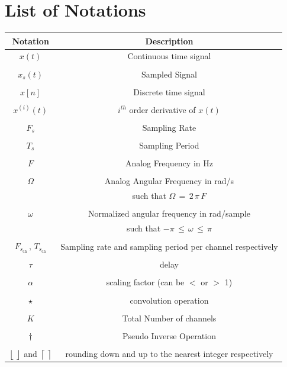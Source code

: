 






\chapter*{List of Notations}

\begin{longtable}{c|c}
Notation & Description \\ \hline
$x(t)$ & Continuous time signal \\ \\
$x_s(t)$ & Sampled Signal \\ \\
$x[n]$ & Discrete time signal \\ \\
$x^{(i)}(t)$ & $i^{th}$ order derivative of $x(t)$ \\ \\
$F_s$ & Sampling Rate \\ \\
$T_s$ & Sampling Period \\ \\
$F$ & Analog Frequency in Hz \\ \\
$\Omega$ & Analog Angular Frequency in rad/s \\
& such that $\Omega \, = \, 2 \, \pi \, F $ \\ \\
$\omega$ & Normalized angular frequency in rad/sample \\
& such that $ -\pi \, \leq \, \omega \, \leq \, \pi$ \\ \\
$F_{s_{\text{ch}}} \, , \, T_{s_{\text{ch}}}$ & Sampling rate and sampling period per channel respectively \\ \\
$\tau$ & delay  \\ \\
$\alpha$ & scaling factor (can be $<$ or $>$ 1) \\ \\
$\star$ & convolution operation \\ \\
$K$ & Total Number of channels \\ \\
$\dagger$ & Pseudo Inverse Operation \\ \\
$\displaystyle\left\lfloor \frac{}{} \right\rfloor$ and $\displaystyle\left\lceil \frac{}{} \right\rceil$ & rounding down and up to the nearest integer respectively


\end{longtable}




